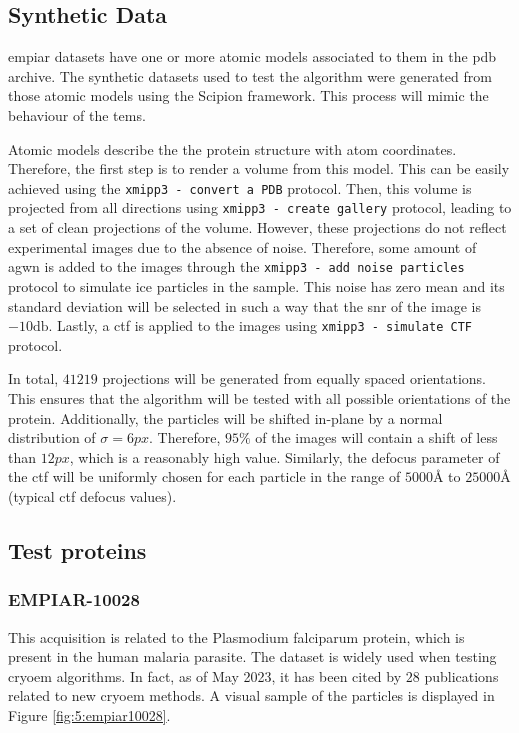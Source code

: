 \documentclass[../main.tex]{subfiles}
\begin{document}
\subsection{Synthetic Data}
\Gls{empiar} datasets have one or more atomic models associated to them in the \gls{pdb} archive. The synthetic datasets used to test the algorithm were generated from those atomic models using the Scipion framework\cite{delarosa2016}. This process will mimic the behaviour of the \glspl{tem}.

Atomic models describe the the protein structure with atom coordinates. Therefore, the first step is to render a volume from this model. This can be easily achieved using the \texttt{xmipp3 - convert a PDB} protocol. Then, this volume is projected from all directions using \texttt{xmipp3 - create gallery} protocol, leading to a set of clean projections of the volume. However, these projections do not reflect experimental images due to the absence of noise. Therefore, some amount of \gls{agwn} is added to the images through the \texttt{xmipp3 - add noise particles} protocol to simulate ice particles in the sample. This noise has zero mean and its standard deviation will be selected in such a way that the \gls{snr} of the image is $-10 \si{\decibel}$. Lastly, a \gls{ctf} is applied to the images using \texttt{xmipp3 - simulate CTF} protocol. 

In total, $41219$ projections will be generated from equally spaced orientations. This ensures that the algorithm will be tested with all possible orientations of the protein. Additionally, the particles will be shifted in-plane by a normal distribution of $\sigma=6\si{px}$. Therefore, $95\si{\percent}$ of the images will contain a shift of less than $12 \si{px}$, which is a reasonably high value. Similarly, the defocus parameter of the \gls{ctf} will be uniformly chosen for each particle in the range of $5000 \si{\angstrom}$ to $25000 \si{\angstrom}$ (typical \gls{ctf} defocus values).


\subsection{Test proteins}
\subsubsection{EMPIAR-10028}
This acquisition is related to the Plasmodium falciparum protein, which is present in the human malaria parasite\cite{wong2014}\cite{empiar10028}. The dataset is widely used when testing \gls{cryoem} algorithms. In fact, as of May 2023, it has been cited by $28$ publications related to new \gls{cryoem} methods. A visual sample of the particles is displayed in Figure \ref{fig:5:empiar10028}.
\end{document}
